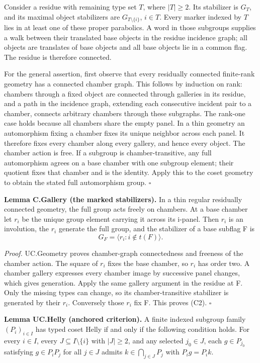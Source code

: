 Consider a residue with remaining type set \(T\), where \(|T|\geq2\).
Its stabilizer is \(G_T\), and its maximal object stabilizers are
\(G_{T\setminus\{i\}}\), \(i\in T\). Every marker indexed by \(T\) lies
in at least one of these proper parabolics. A word in those subgroups
supplies a walk between their translated base objects in the residue
incidence graph; all objects are translates of base objects and all base
objects lie in a common flag. The residue is therefore connected.

For the general assertion, first observe that every residually connected
finite-rank geometry has a connected chamber graph. This follows by
induction on rank: chambers through a fixed object are connected through
galleries in its residue, and a path in the incidence graph, extending
each consecutive incident pair to a chamber, connects arbitrary chambers
through these subgraphs. The rank-one case holds because all chambers
share the empty panel. In a thin geometry an automorphism fixing a
chamber fixes its unique neighbor across each panel. It therefore fixes
every chamber along every gallery, and hence every object. The chamber
action is free. If a subgroup is chamber-transitive, any full
automorphism agrees on a base chamber with one subgroup element; their
quotient fixes that chamber and is the identity. Apply this to the coset
geometry to obtain the stated full automorphism group. \(\square\)

\textbf{Lemma C.Gallery (the marked stabilizers).} In a thin regular
residually connected geometry, the full group acts freely on chambers.
At a base chamber let \(r_i\) be the unique group element carrying it
across its i-panel. Then \(r_i\) is an involution, the \(r_i\) generate
the full group, and the stabilizer of a base subflag F is \[
G_F=\langle r_i:i\notin t(F)\rangle.
\tag{C2}
\]

\emph{Proof.} UC.Geometry proves chamber-graph connectedness and
freeness of the chamber action. The square of \(r_i\) fixes the base
chamber, so \(r_i\) has order two. A chamber gallery expresses every
chamber image by successive panel changes, which gives generation. Apply
the same gallery argument in the residue at F. Only the missing types
can change, so its chamber-transitive stabilizer is generated by their
\(r_i\). Conversely those \(r_i\) fix F. This proves (C2). \(\square\)

\textbf{Lemma UC.Helly (anchored criterion).} A finite indexed subgroup
family \((P_i)_{i\in I}\) has typed coset Helly if and only if the
following condition holds. For every \(i\in I\), every
\(J\subseteq I\setminus\{i\}\) with \(|J|\geq2\), and any selected
\(j_0\in J\), each \(g\in P_{j_0}\) satisfying \(g\in P_iP_j\) for all
\(j\in J\) admits \(k\in\bigcap_{j\in J}P_j\) with \(P_i g=P_i k\).

